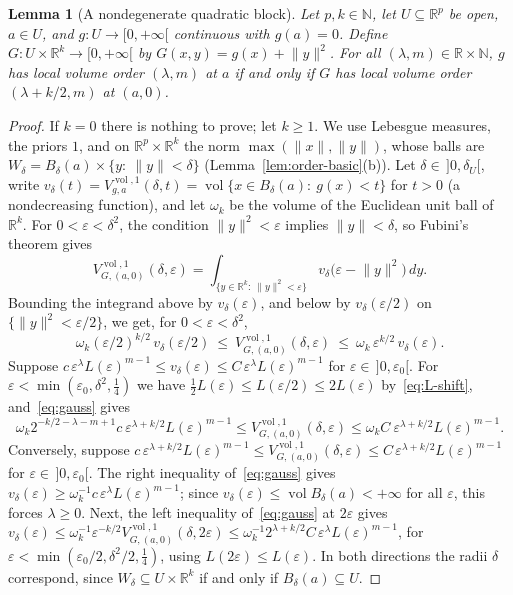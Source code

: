 \documentclass[11pt,a4paper]{article}
\newtheorem{lemma}[theorem]{Lemma}
\theoremstyle{definition}
\theoremstyle{remark}
\numberwithin{equation}{section}
\newcommand{\N}{\mathbb{N}}
\newcommand{\R}{\mathbb{R}}
\newcommand{\vol}{\operatorname{vol}}
\newcommand{\norm}[1]{\lVert #1\rVert}
\newcommand{\eps}{\varepsilon}
\begin{document}
\begin{lemma}[A nondegenerate quadratic block]\label{lem:gauss}
Let $p,k\in\N$, let $U\subseteq\R^p$ be open, $a\in U$, and $g:U\to[0,+\infty[$ continuous with $g(a)=0$. Define $G:U\times\R^k\to[0,+\infty[$ by $G(x,y)=g(x)+\norm y^2$. For all $(\lambda,m)\in\R\times\N$, $g$ has local volume order $(\lambda,m)$ at $a$ if and only if $G$ has local volume order $(\lambda+k/2,m)$ at $(a,0)$.
\end{lemma}
\begin{proof}
If $k=0$ there is nothing to prove; let $k\ge1$. We use Lebesgue measures, the priors $1$, and on $\R^p\times\R^k$ the norm $\max(\norm x,\norm y)$, whose balls are $W_\delta=B_\delta(a)\times\{y:\ \norm y<\delta\}$ (Lemma~\ref{lem:order-basic}(b)). Let $\delta\in\,]0,\delta_U[$, write $v_\delta(t)=V^{\vol,1}_{g,a}(\delta,t)=\vol\{x\in B_\delta(a):\ g(x)<t\}$ for $t>0$ (a nondecreasing function), and let $\omega_k$ be the volume of the Euclidean unit ball of $\R^k$. For $0<\eps<\delta^2$, the condition $\norm y^2<\eps$ implies $\norm y<\delta$, so Fubini's theorem gives
\[
V^{\vol,1}_{G,(a,0)}(\delta,\eps)=\int_{\{y\in\R^k:\ \norm y^2<\eps\}}v_\delta\bigl(\eps-\norm y^2\bigr)\,dy .
\]
Bounding the integrand above by $v_\delta(\eps)$, and below by $v_\delta(\eps/2)$ on $\{\norm y^2<\eps/2\}$, we get, for $0<\eps<\delta^2$,
\begin{equation}\label{eq:gauss}
\omega_k(\eps/2)^{k/2}\,v_\delta(\eps/2)\ \le\ V^{\vol,1}_{G,(a,0)}(\delta,\eps)\ \le\ \omega_k\,\eps^{k/2}\,v_\delta(\eps).
\end{equation}
Suppose $c\,\eps^\lambda L(\eps)^{m-1}\le v_\delta(\eps)\le C\,\eps^\lambda L(\eps)^{m-1}$ for $\eps\in\,]0,\eps_0[$. For $\eps<\min(\eps_0,\delta^2,\frac14)$ we have $\frac12L(\eps)\le L(\eps/2)\le2L(\eps)$ by~\eqref{eq:L-shift}, and~\eqref{eq:gauss} gives
\[
\omega_k2^{-k/2-\lambda-m+1}c\ \eps^{\lambda+k/2}L(\eps)^{m-1}\le V^{\vol,1}_{G,(a,0)}(\delta,\eps)\le\omega_kC\ \eps^{\lambda+k/2}L(\eps)^{m-1}.
\]
Conversely, suppose $c\,\eps^{\lambda+k/2}L(\eps)^{m-1}\le V^{\vol,1}_{G,(a,0)}(\delta,\eps)\le C\,\eps^{\lambda+k/2}L(\eps)^{m-1}$ for $\eps\in\,]0,\eps_0[$. The right inequality of~\eqref{eq:gauss} gives $v_\delta(\eps)\ge\omega_k^{-1}c\,\eps^\lambda L(\eps)^{m-1}$; since $v_\delta(\eps)\le\vol B_\delta(a)<+\infty$ for all $\eps$, this forces $\lambda\ge0$. Next, the left inequality of~\eqref{eq:gauss} at $2\eps$ gives $v_\delta(\eps)\le\omega_k^{-1}\eps^{-k/2}V^{\vol,1}_{G,(a,0)}(\delta,2\eps)\le\omega_k^{-1}2^{\lambda+k/2}C\,\eps^\lambda L(\eps)^{m-1}$, for $\eps<\min(\eps_0/2,\delta^2/2,\frac14)$, using $L(2\eps)\le L(\eps)$. In both directions the radii $\delta$ correspond, since $W_\delta\subseteq U\times\R^k$ if and only if $B_\delta(a)\subseteq U$.
\end{proof}
\end{document}
